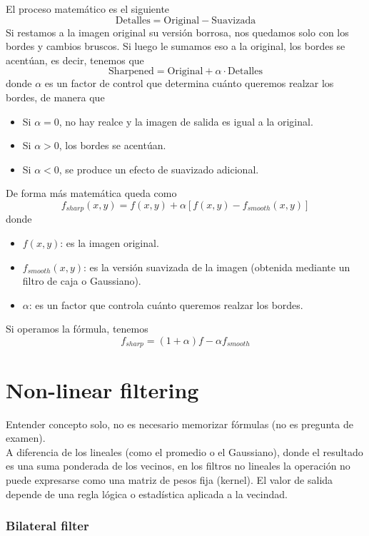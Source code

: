 \noindent
El proceso matemático es el siguiente
\begin{equation*}
    \text{Detalles} = \text{Original} - \text{Suavizada}
\end{equation*}
Si restamos a la imagen original su versión borrosa, nos quedamos solo con los bordes y cambios bruscos. Si luego le sumamos eso a la original, los bordes se acentúan, es decir, tenemos que
\begin{equation*}
    \text{Sharpened} = \text{Original} + \alpha \cdot \text{Detalles}
\end{equation*}
donde $\alpha$ es un factor de control que determina cuánto queremos realzar los bordes, de manera que 
\begin{itemize}
    \item Si $\alpha = 0$, no hay realce y la imagen de salida es igual a la original.
    \item Si $\alpha > 0$, los bordes se acentúan.
    \item Si $\alpha < 0$, se produce un efecto de suavizado adicional.
\end{itemize}
De forma más matemática queda como
$$f_{sharp}(x,y) = f(x,y) + \alpha [f(x,y) - f_{smooth}(x,y)]$$
donde 
\begin{itemize}
    \item $f(x,y)$: es la imagen original.
    \item $f_{smooth}(x,y)$: es la versión suavizada de la imagen (obtenida mediante un filtro de caja o Gaussiano).
    \item $\alpha$: es un factor que controla cuánto queremos realzar los bordes.
\end{itemize}
Si operamos la fórmula, tenemos
$$f_{sharp} = (1+\alpha)f - \alpha f_{smooth}$$

\section{Non-linear filtering}
\noindent 
Entender concepto solo, no es necesario memorizar fórmulas (no es pregunta de examen). \\

\noindent
A diferencia de los lineales (como el promedio o el Gaussiano), donde el resultado es una suma ponderada de los vecinos, en los filtros no lineales la operación no puede expresarse como una matriz de pesos fija (kernel). El valor de salida depende de una regla lógica o estadística aplicada a la vecindad.


\subsubsection{Bilateral filter}

